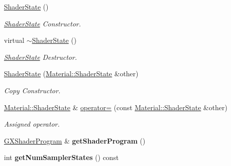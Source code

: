 \begin{DoxyCompactItemize}
\item 
\hyperlink{class_i_dream_sky_1_1_material_1_1_shader_state_a136c9efd9ca8e1506bba6a2b413e14fc}{Shader\+State} ()
\begin{DoxyCompactList}\small\item\em \hyperlink{class_i_dream_sky_1_1_material_1_1_shader_state}{Shader\+State} Constructor. \end{DoxyCompactList}\item 
virtual \hyperlink{class_i_dream_sky_1_1_material_1_1_shader_state_af53e63ba16b2ff1fdda59d396d52ab9e}{$\sim$\+Shader\+State} ()
\begin{DoxyCompactList}\small\item\em \hyperlink{class_i_dream_sky_1_1_material_1_1_shader_state}{Shader\+State} Destructor. \end{DoxyCompactList}\item 
\hyperlink{class_i_dream_sky_1_1_material_1_1_shader_state_a4236bb4848d2cfcc915ded3b7e98ef85}{Shader\+State} (\hyperlink{class_i_dream_sky_1_1_material_1_1_shader_state}{Material\+::\+Shader\+State} \&other)
\begin{DoxyCompactList}\small\item\em Copy Constructor. \end{DoxyCompactList}\item 
\hyperlink{class_i_dream_sky_1_1_material_1_1_shader_state}{Material\+::\+Shader\+State} \& \hyperlink{class_i_dream_sky_1_1_material_1_1_shader_state_a87ce1a3faa6f5680033047b349d02893}{operator=} (const \hyperlink{class_i_dream_sky_1_1_material_1_1_shader_state}{Material\+::\+Shader\+State} \&other)
\begin{DoxyCompactList}\small\item\em Assigned operator. \end{DoxyCompactList}\item 
\hyperlink{class_i_dream_sky_1_1_g_x_shader_program}{G\+X\+Shader\+Program} \& {\bfseries get\+Shader\+Program} ()\hypertarget{class_i_dream_sky_1_1_material_1_1_shader_state_a0f8f3634b19c8e3cf88e0e8558933e5c}{}\label{class_i_dream_sky_1_1_material_1_1_shader_state_a0f8f3634b19c8e3cf88e0e8558933e5c}

\item 
int {\bfseries get\+Num\+Sampler\+States} () const \hypertarget{class_i_dream_sky_1_1_material_1_1_shader_state_a94f0c0987667eca7b07c5e6b712ebd6d}{}\label{class_i_dream_sky_1_1_material_1_1_shader_state_a94f0c0987667eca7b07c5e6b712ebd6d}


\end{DoxyCompactItemize}
